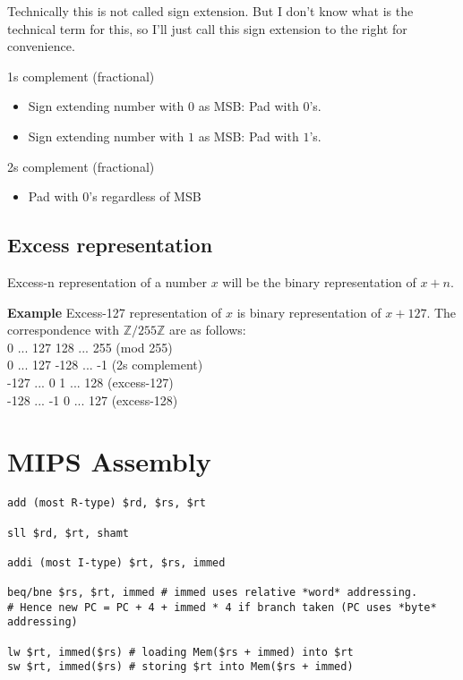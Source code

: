 \documentclass{article}
\begin{document}
Technically this is not called sign extension. But I don't know what is the technical term for this, so I'll just call this sign extension to the right for convenience.


1s complement (fractional)
\begin{itemize}
	\item Sign extending number with $0$ as MSB: Pad with $0$'s.
	\item Sign extending number with $1$ as MSB: Pad with $1$'s.
\end{itemize}

2s complement (fractional)
\begin{itemize}
	\item Pad with $0$'s regardless of MSB
\end{itemize}

\subsection{Excess representation}
Excess-n representation of a number $x$ will be the binary representation of $x+n$.

\textbf{Example} Excess-127 representation of $x$ is binary representation of $x+127$.
The correspondence with $\mathbb{Z}/255\mathbb{Z}$ are as follows:\\
0 ... 127 128 ... 255 (mod 255)\\
0 ... 127 -128 ... -1 (2s complement)\\
-127 ... 0 1 ... 128 (excess-127)\\
-128 ... -1 0 ... 127 (excess-128)

\section{MIPS Assembly}
\begin{verbatim}
add (most R-type) $rd, $rs, $rt

sll $rd, $rt, shamt

addi (most I-type) $rt, $rs, immed

beq/bne $rs, $rt, immed # immed uses relative *word* addressing. 
# Hence new PC = PC + 4 + immed * 4 if branch taken (PC uses *byte* addressing)

lw $rt, immed($rs) # loading Mem($rs + immed) into $rt
sw $rt, immed($rs) # storing $rt into Mem($rs + immed)
\end{verbatim}
\end{document}
